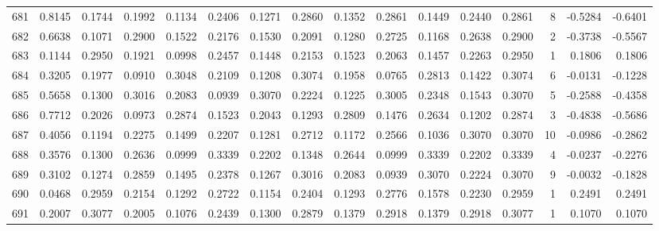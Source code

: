 \begin{tabular}{lrrrrrrrrrrrrrrr}
681 &      0.8145 &  0.1744 &  0.1992 &  0.1134 &  0.2406 &  0.1271 &  0.2860 &  0.1352 &  0.2861 &  0.1449 &   0.2440 &     0.2861 &      8 &                   -0.5284 &                    -0.6401 \\
682 &      0.6638 &  0.1071 &  0.2900 &  0.1522 &  0.2176 &  0.1530 &  0.2091 &  0.1280 &  0.2725 &  0.1168 &   0.2638 &     0.2900 &      2 &                   -0.3738 &                    -0.5567 \\
683 &      0.1144 &  0.2950 &  0.1921 &  0.0998 &  0.2457 &  0.1448 &  0.2153 &  0.1523 &  0.2063 &  0.1457 &   0.2263 &     0.2950 &      1 &                    0.1806 &                     0.1806 \\
684 &      0.3205 &  0.1977 &  0.0910 &  0.3048 &  0.2109 &  0.1208 &  0.3074 &  0.1958 &  0.0765 &  0.2813 &   0.1422 &     0.3074 &      6 &                   -0.0131 &                    -0.1228 \\
685 &      0.5658 &  0.1300 &  0.3016 &  0.2083 &  0.0939 &  0.3070 &  0.2224 &  0.1225 &  0.3005 &  0.2348 &   0.1543 &     0.3070 &      5 &                   -0.2588 &                    -0.4358 \\
686 &      0.7712 &  0.2026 &  0.0973 &  0.2874 &  0.1523 &  0.2043 &  0.1293 &  0.2809 &  0.1476 &  0.2634 &   0.1202 &     0.2874 &      3 &                   -0.4838 &                    -0.5686 \\
687 &      0.4056 &  0.1194 &  0.2275 &  0.1499 &  0.2207 &  0.1281 &  0.2712 &  0.1172 &  0.2566 &  0.1036 &   0.3070 &     0.3070 &     10 &                   -0.0986 &                    -0.2862 \\
688 &      0.3576 &  0.1300 &  0.2636 &  0.0999 &  0.3339 &  0.2202 &  0.1348 &  0.2644 &  0.0999 &  0.3339 &   0.2202 &     0.3339 &      4 &                   -0.0237 &                    -0.2276 \\
689 &      0.3102 &  0.1274 &  0.2859 &  0.1495 &  0.2378 &  0.1267 &  0.3016 &  0.2083 &  0.0939 &  0.3070 &   0.2224 &     0.3070 &      9 &                   -0.0032 &                    -0.1828 \\
690 &      0.0468 &  0.2959 &  0.2154 &  0.1292 &  0.2722 &  0.1154 &  0.2404 &  0.1293 &  0.2776 &  0.1578 &   0.2230 &     0.2959 &      1 &                    0.2491 &                     0.2491 \\
691 &      0.2007 &  0.3077 &  0.2005 &  0.1076 &  0.2439 &  0.1300 &  0.2879 &  0.1379 &  0.2918 &  0.1379 &   0.2918 &     0.3077 &      1 &                    0.1070 &                     0.1070 \\

\end{tabular}
